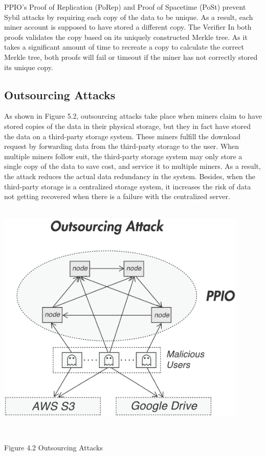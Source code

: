 \documentclass[10pt,a4paper]{article}
\begin{document}
\noindent   
PPIO’s Proof of Replication (PoRep) and Proof of Spacetime (PoSt) prevent Sybil attacks by requiring each copy of the data to be unique.  As a result, each miner account is supposed to have stored a different copy. The Verifier In both proofs validates the copy based on its uniquely constructed Merkle tree. As it takes a significant amount of time to recreate a copy to calculate the correct Merkle tree, both proofs will fail or timeout if the miner has not correctly stored its unique copy. 

      \subsection{Outsourcing Attacks}  %
As shown in Figure 5.2, outsourcing attacks take place when miners claim to have stored copies of the data in their physical storage, but they in fact have stored the data on a third-party storage system. These miners fulfill the download request by forwarding data from the third-party storage to the user. When multiple miners follow suit, the third-party storage system may only store a single copy of the data to save cost, and service it to multiple miners. As a result, the attack reduces the actual data redundancy in the system. Besides, when the third-party storage is a centralized storage system, it increases the risk of data not getting recovered when there is a failure with the centralized server.
   \vspace{-0.5em}
\\
\\ \centerline{\includegraphics[width=340pt]{fig16}}
\\ \centerline{{ Figure 4.2 Outsourcing Attacks}}
   \vspace{-1.5em}
 \\
\end{document}
